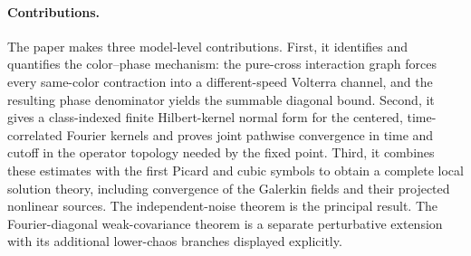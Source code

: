 \documentclass[10pt]{amsart}
\numberwithin{equation}{section}
\theoremstyle{plain}
\theoremstyle{definition}
\theoremstyle{remark}
\begin{document}
\paragraph{Contributions.}
The paper makes three model-level contributions.  First, it identifies and quantifies the color--phase mechanism: the pure-cross interaction graph forces every same-color contraction into a different-speed Volterra channel, and the resulting phase denominator yields the summable diagonal bound.  Second, it gives a class-indexed finite Hilbert-kernel normal form for the centered, time-correlated Fourier kernels and proves joint pathwise convergence in time and cutoff in the operator topology needed by the fixed point.  Third, it combines these estimates with the first Picard and cubic symbols to obtain a complete local solution theory, including convergence of the Galerkin fields and their projected nonlinear sources.  The independent-noise theorem is the principal result.  The Fourier-diagonal weak-covariance theorem is a separate perturbative extension with its additional lower-chaos branches displayed explicitly.
\end{document}
